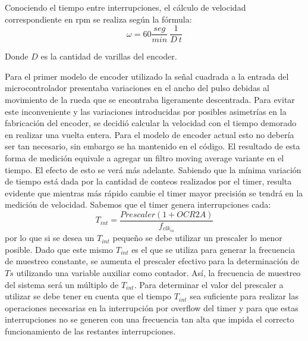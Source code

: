 \documentclass[10pt,conference,a4paper,onecolumn]{article}%
\begin{document}
Conociendo el tiempo entre interrupciones, el cálculo de velocidad correspondiente en rpm se realiza según la fórmula:
\begin{equation*}
\omega=60 \frac{seg}{min}\ \frac{1}{D\ t}
\end{equation*}

Donde $D$ es la cantidad de varillas del encoder. 

Para el primer modelo de encoder utilizado la señal cuadrada a la entrada del microcontrolador presentaba variaciones en el ancho del pulso debidas al movimiento de la rueda que se encontraba ligeramente descentrada. Para evitar este inconveniente y las variaciones introducidas por posibles asimetrías en la fabricación del encoder,
se decidió calcular la velocidad con el tiempo demorado en realizar una vuelta entera. Para el modelo de encoder actual esto no debería ser tan necesario, sin embargo se ha mantenido en el código. El resultado de esta forma de medición equivale a agregar un filtro moving average variante en el tiempo. El efecto de esto se verá más
adelante.
Sabiendo que la mínima variación de tiempo está dada por la cantidad de conteos realizados por el timer, resulta evidente que mientras más rápido cambie el timer mayor precisión se tendrá en la medición de velocidad.
Sabemos que el timer genera interrupciones cada:
\begin{equation}
T_{int}=\frac{Prescaler(1+OCR2A)}{f_{clk_{io}}}
\end{equation}
por lo que si se desea un $T_{int}$ pequeño se debe utilizar un prescaler lo menor posible. Dado que este mismo $T_{int}$ es el que se utiliza para generar la frecuencia de muestreo constante, se aumenta el prescaler efectivo para la determinación de $Ts$ utilizando una variable auxiliar como contador. Así, la frecuencia de muestreo del sistema será un múltiplo de $T_{int}$. Para determinar el valor del prescaler a utilizar se debe tener en cuenta que el tiempo $T_{int}$ sea suficiente para realizar las operaciones necesarias en la interrupción por overflow del timer y para que estas interrupciones no se generen con una frecuencia tan alta que impida el correcto funcionamiento de las restantes interrupciones.
\end{document}
